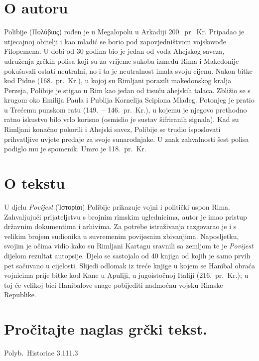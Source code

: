 \section*{O autoru}

Polibije \textgreek[variant=ancient]{(Πολύβιος)} rođen je u Megalopolu u Arkadiji 200.\ pr.~Kr. Pripadao je utjecajnoj obitelji i kao mladić se borio pod zapovjedništvom vojskovođe Filopemena. U dobi od 30 godina bio je jedan od vođa Ahejskog saveza, udruženja grčkih polisa koji su za vrijeme sukoba između Rima i Makedonije pokušavali ostati neutralni, no i ta je neutralnost imala svoju cijenu. Nakon bitke kod Pidne (168.\ pr.~Kr.), u kojoj su Rimljani porazili makedonskog kralja Perzeja, Polibije je stigao u Rim kao jedan od tisuću ahejskih talaca. Zbližio se s krugom oko Emilija Paula i Publija Kornelija Scipiona Mlađeg. Potonjeg je pratio u Trećemu punskom ratu (149.\ – 146.\ pr.~Kr.), u kojemu je njegovo prethodno ratno iskustvo bilo vrlo korisno (osmislio je sustav šifriranih signala). Kad su Rimljani konačno pokorili i Ahejski savez, Polibije se trudio isposlovati prihvatljive uvjete predaje za svoje sunarodnjake. U znak zahvalnosti šest polisa podiglo mu je spomenik. Umro je 118.\ pr.~Kr.

\section*{O tekstu}

U djelu \textit{Povijest} \textgreek[variant=ancient]{(Ἱστορίαι)} Polibije prikazuje vojni i politički uspon Rima. Zahvaljujući prijateljstvu s brojnim rimskim uglednicima, autor je imao pristup državnim dokumentima i arhivima. Za potrebe istraživanja razgovarao je i s velikim brojem sudionika u suvremenim povijesnim zbivanjima. Naposljetku, svojim je očima vidio kako su Rimljani Kartagu sravnili sa zemljom te je \textit{Povijest} dijelom rezultat autopsije. Djelo se sastojalo od 40 knjiga od kojih je samo prvih pet sačuvano u cijelosti. Slijedi odlomak iz treće knjige u kojem se Hanibal obraća vojnicima prije bitke kod Kane u Apuliji, u jugoistočnoj Italiji (216.\ pr.~Kr.); u toj će velikoj bici Hanibalove snage pobijediti nadmoćnu vojsku Rimske Republike.


\section*{Pročitajte naglas grčki tekst.}
Polyb.\ Historiae 3.111.3


